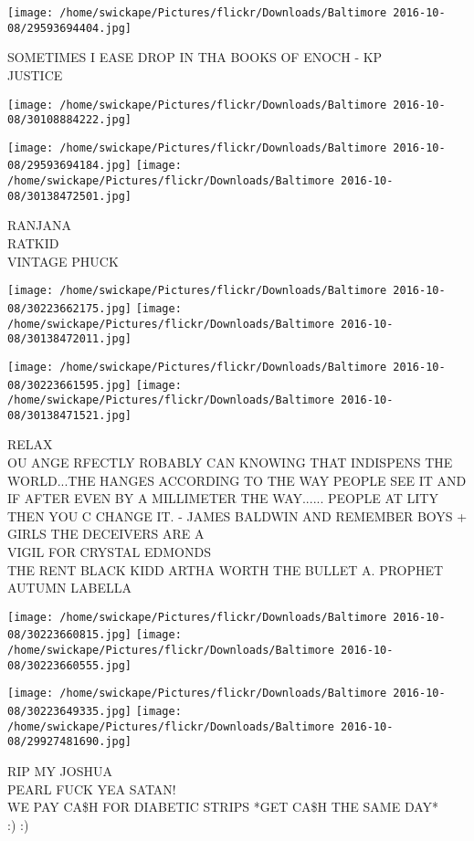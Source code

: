 \documentclass[10pt,letterpaper]{article}
\begin{document}
\vspace{0.25in}
\texttt{[image: /home/swickape/Pictures/flickr/Downloads/Baltimore 2016-10-08/29593694404.jpg]}

SOMETIMES I EASE DROP IN THA BOOKS OF ENOCH {-} KP\\
JUSTICE
\pagebreak

\texttt{[image: /home/swickape/Pictures/flickr/Downloads/Baltimore 2016-10-08/30108884222.jpg]}

\vspace{0.25in}
\texttt{[image: /home/swickape/Pictures/flickr/Downloads/Baltimore 2016-10-08/29593694184.jpg]}
\texttt{[image: /home/swickape/Pictures/flickr/Downloads/Baltimore 2016-10-08/30138472501.jpg]}

RANJANA\\
RATKID\\
VINTAGE PHUCK
\pagebreak

\texttt{[image: /home/swickape/Pictures/flickr/Downloads/Baltimore 2016-10-08/30223662175.jpg]}
\texttt{[image: /home/swickape/Pictures/flickr/Downloads/Baltimore 2016-10-08/30138472011.jpg]}

\texttt{[image: /home/swickape/Pictures/flickr/Downloads/Baltimore 2016-10-08/30223661595.jpg]}
\texttt{[image: /home/swickape/Pictures/flickr/Downloads/Baltimore 2016-10-08/30138471521.jpg]}

RELAX\\
OU ANGE RFECTLY ROBABLY CAN KNOWING THAT INDISPENS THE WORLD...THE HANGES ACCORDING TO THE WAY PEOPLE SEE IT AND IF AFTER EVEN BY A MILLIMETER THE WAY...... PEOPLE AT LITY THEN YOU C CHANGE IT. {-} JAMES BALDWIN AND REMEMBER BOYS + GIRLS THE DECEIVERS ARE A\\
VIGIL FOR CRYSTAL EDMONDS\\
THE RENT BLACK KIDD ARTHA WORTH THE BULLET A. PROPHET AUTUMN LABELLA
\pagebreak

\texttt{[image: /home/swickape/Pictures/flickr/Downloads/Baltimore 2016-10-08/30223660815.jpg]}
\texttt{[image: /home/swickape/Pictures/flickr/Downloads/Baltimore 2016-10-08/30223660555.jpg]}

\texttt{[image: /home/swickape/Pictures/flickr/Downloads/Baltimore 2016-10-08/30223649335.jpg]}
\texttt{[image: /home/swickape/Pictures/flickr/Downloads/Baltimore 2016-10-08/29927481690.jpg]}

RIP MY JOSHUA\\
PEARL FUCK YEA SATAN!\\
WE PAY CA\$H FOR DIABETIC STRIPS *GET CA\$H THE SAME DAY*\\
:) :)
\pagebreak
\end{document}
